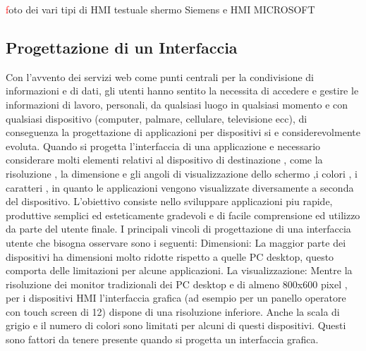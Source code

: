 \documentclass[12pt, a4paper, oneside]{book}
\begin{document}
\textcolor{red}foto dei vari tipi di HMI testuale shermo Siemens e HMI MICROSOFT

\subsection{Progettazione di un Interfaccia}
Con l’avvento dei servizi web come punti centrali per la condivisione di informazioni e di dati, gli utenti hanno sentito la necessita di accedere e gestire le informazioni di lavoro, personali, da qualsiasi luogo in qualsiasi momento e con qualsiasi dispositivo (computer, palmare, cellulare, televisione ecc), di conseguenza la progettazione di applicazioni per dispositivi si e considerevolmente evoluta. Quando si progetta l’interfaccia di una applicazione e necessario considerare  molti elementi relativi al dispositivo di destinazione , come la risoluzione , la dimensione e gli angoli di visualizzazione dello schermo ,i colori , i caratteri , in quanto le applicazioni vengono visualizzate diversamente a seconda del dispositivo. L’obiettivo consiste nello sviluppare applicazioni piu rapide, produttive semplici ed esteticamente gradevoli e di facile comprensione ed utilizzo da parte del utente finale. I principali vincoli di progettazione di una interfaccia utente che bisogna osservare sono i seguenti:
Dimensioni: La maggior parte dei dispositivi ha dimensioni molto ridotte rispetto a quelle PC desktop, questo comporta delle limitazioni per alcune applicazioni.
La visualizzazione: Mentre la risoluzione dei monitor tradizionali dei PC desktop e di almeno 800x600 pixel , per i dispositivi HMI l’interfaccia grafica (ad esempio per un panello operatore con touch screen di 12) dispone di una risoluzione inferiore. Anche la scala di grigio e il numero di colori sono limitati per alcuni di questi dispositivi. Questi sono fattori da tenere presente quando si progetta un interfaccia grafica.
\end{document}
